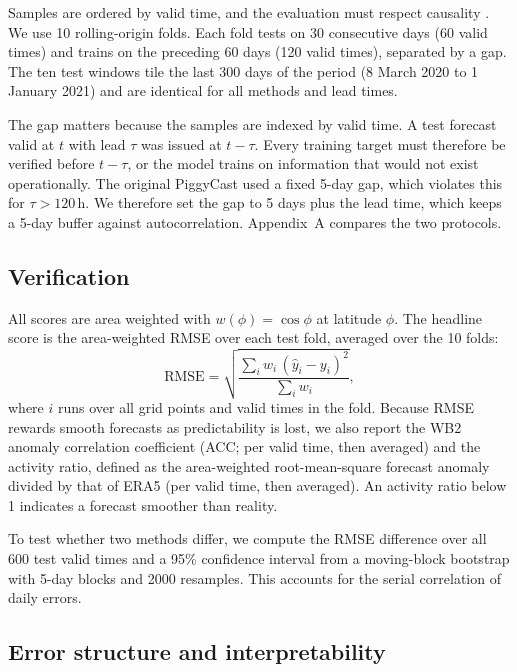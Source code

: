 \documentclass[twocol]{ametsocV6.1}
\begin{document}
Samples are ordered by valid time, and the evaluation must respect causality \citep{bergmeir2018cv, cerqueira2020evaluating, roberts2017cv}. We use 10 rolling-origin folds. Each fold tests on 30 consecutive days (60 valid times) and trains on the preceding 60 days (120 valid times), separated by a gap. The ten test windows tile the last 300 days of the period (8 March 2020 to 1 January 2021) and are identical for all methods and lead times.

The gap matters because the samples are indexed by valid time. A test forecast valid at $t$ with lead $\tau$ was issued at $t-\tau$. Every training target must therefore be verified before $t-\tau$, or the model trains on information that would not exist operationally. The original PiggyCast used a fixed 5-day gap, which violates this for $\tau>120$\,h. We therefore set the gap to 5 days plus the lead time, which keeps a 5-day buffer against autocorrelation. Appendix~A compares the two protocols.

\subsection{Verification}

All scores are area weighted with $w(\phi)=\cos\phi$ at latitude $\phi$. The headline score is the area-weighted RMSE over each test fold, averaged over the 10 folds:
\begin{equation}
\mathrm{RMSE} = \sqrt{\frac{\sum_{i} w_i\,(\hat{y}_i-y_i)^2}{\sum_i w_i}},
\end{equation}
where $i$ runs over all grid points and valid times in the fold. Because RMSE rewards smooth forecasts as predictability is lost, we also report the WB2 anomaly correlation coefficient (ACC; per valid time, then averaged) and the activity ratio, defined as the area-weighted root-mean-square forecast anomaly divided by that of ERA5 (per valid time, then averaged). An activity ratio below 1 indicates a forecast smoother than reality.

To test whether two methods differ, we compute the RMSE difference over all 600 test valid times and a 95\% confidence interval from a moving-block bootstrap \citep{kunsch1989bootstrap} with 5-day blocks and 2000 resamples. This accounts for the serial correlation of daily errors.

\subsection{Error structure and interpretability}
\end{document}
